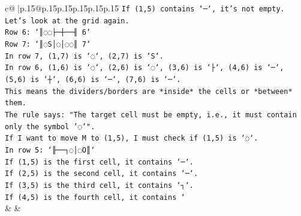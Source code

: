 \documentclass{article}
\begin{document}
{\begin{supertabular}{c@{$\;$}|p{.15\linewidth}@{}p{.15\linewidth}p{.15\linewidth}p{.15\linewidth}p{.15\linewidth}p{.15\linewidth}}
{{{\texttt{If (1,5) contains `─`, it's not empty.} \\
\texttt{Let's look at the grid again.} \\
\texttt{Row 6: `║◌◌├─┼──╢ 6`} \\
\texttt{Row 7: `║◌S│◌│◌◌║ 7`} \\
\texttt{In row 7, (1,7) is `◌`, (2,7) is `S`.} \\
\texttt{In row 6, (1,6) is `◌`, (2,6) is `◌`, (3,6) is `├`, (4,6) is `─`, (5,6) is `┼`, (6,6) is `─`, (7,6) is `─`.} \\
\texttt{This means the dividers/borders are *inside* the cells or *between* them.} \\
\texttt{The rule says: "The target cell must be empty, i.e., it must contain only the symbol '◌'".} \\
\texttt{If I want to move M to (1,5), I must check if (1,5) is `◌`.} \\
\texttt{In row 5: `╟──┐◌│◌O║`} \\
\texttt{If (1,5) is the first cell, it contains `─`.} \\
\texttt{If (2,5) is the second cell, it contains `─`.} \\
\texttt{If (3,5) is the third cell, it contains `┐`.} \\
\texttt{If (4,5) is the fourth cell, it contains `} \\
            }
        }
    }
    & & \\ \\


\end{supertabular}}
\end{document}
